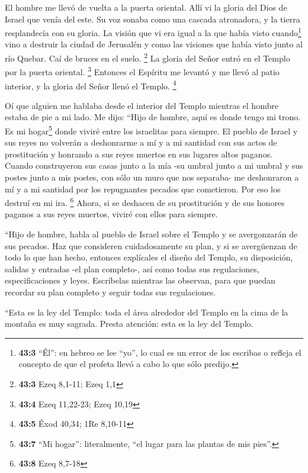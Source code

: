  El hombre me llevó de vuelta a la puerta oriental.
 Allí vi la gloria del Dios de Israel que venía del este.
Su voz sonaba como una cascada atronadora, y la tierra resplandecía con
su gloria.  La visión que vi era igual a la que había
visto cuando\footnote{\textbf{43:3} ``Él'': en hebreo se lee ``yo'', lo
  cual es un error de los escribas o refleja el concepto de que el
  profeta llevó a cabo lo que sólo predijo.} vino a destruir la ciudad
de Jerusalén y como las visiones que había visto junto al río Quebar.
Caí de bruces en el suelo. \footnote{\textbf{43:3} Ezeq 8,1-11; Ezeq 1,1}
 La gloria del Señor entró en el Templo por la puerta
oriental. \footnote{\textbf{43:4} Ezeq 11,22-23; Ezeq 10,19}
 Entonces el Espíritu me levantó y me llevó al patio
interior, y la gloria del Señor llenó el Templo. \footnote{\textbf{43:5}
  Éxod 40,34; 1Re 8,10-11}

 Oí que alguien me hablaba desde el interior del Templo
mientras el hombre estaba de pie a mi lado.  Me dijo:
``Hijo de hombre, aquí es donde tengo mi trono. Es mi hogar\footnote{\textbf{43:7}
  ``Mi hogar'': literalmente, ``el lugar para las plantas de mis pies''.}
donde viviré entre los israelitas para siempre. El pueblo de Israel y
sus reyes no volverán a deshonrarme a mí y a mi santidad con sus actos
de prostitución y honrando a sus reyes muertos en sus lugares altos
paganos.  Cuando construyeron sus casas junto a la mía -su
umbral junto a mi umbral y sus postes junto a mis postes, con sólo un
muro que nos separaba- me deshonraron a mí y a mi santidad por los
repugnantes pecados que cometieron. Por eso los destruí en mi ira.
\footnote{\textbf{43:8} Ezeq 8,7-18}  Ahora, si se
deshacen de su prostitución y de sus honores paganos a sus reyes
muertos, viviré con ellos para siempre.

 ``Hijo de hombre, habla al pueblo de Israel sobre el
Templo y se avergonzarán de sus pecados. Haz que consideren
cuidadosamente su plan,  y si se avergüenzan de todo lo
que han hecho, entonces explícales el diseño del Templo, su disposición,
salidas y entradas -el plan completo-, así como todas sus regulaciones,
especificaciones y leyes. Escríbelas mientras las observan, para que
puedan recordar su plan completo y seguir todas sus regulaciones.

 ``Esta es la ley del Templo: toda el área alrededor del
Templo en la cima de la montaña es muy sagrada. Presta atención: esta es
la ley del Templo.

